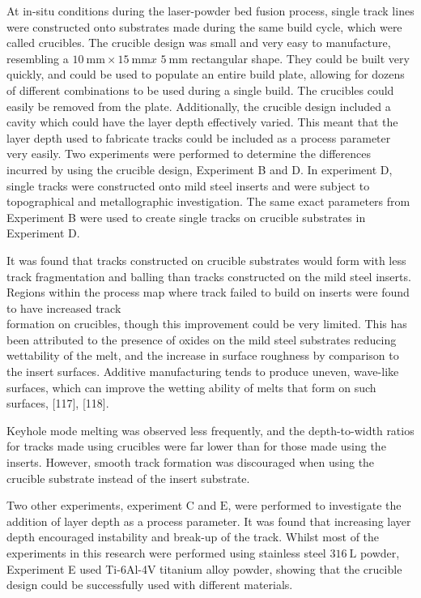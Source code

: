 \documentclass[10pt]{article}
\begin{document}
At in-situ conditions during the laser-powder bed fusion process, single track lines were constructed onto substrates made during the same build cycle, which were called crucibles. The crucible design was small and very easy to manufacture, resembling a $10 \mathrm{~mm} \times 15 \mathrm{~mm} x$ $5 \mathrm{~mm}$ rectangular shape. They could be built very quickly, and could be used to populate an entire build plate, allowing for dozens of different combinations to be used during a single build. The crucibles could easily be removed from the plate. Additionally, the crucible design included a cavity which could have the layer depth effectively varied. This meant that the layer depth used to fabricate tracks could be included as a process parameter very easily. Two experiments were performed to determine the differences incurred by using the crucible design, Experiment B and D. In experiment D, single tracks were constructed onto mild steel inserts and were subject to topographical and metallographic investigation. The same exact parameters from Experiment B were used to create single tracks on crucible substrates in Experiment D.

It was found that tracks constructed on crucible substrates would form with less track fragmentation and balling than tracks constructed on the mild steel inserts. Regions within the process map where track failed to build on inserts were found to have increased track\\
formation on crucibles, though this improvement could be very limited. This has been attributed to the presence of oxides on the mild steel substrates reducing wettability of the melt, and the increase in surface roughness by comparison to the insert surfaces. Additive manufacturing tends to produce uneven, wave-like surfaces, which can improve the wetting ability of melts that form on such surfaces, [117], [118].

Keyhole mode melting was observed less frequently, and the depth-to-width ratios for tracks made using crucibles were far lower than for those made using the inserts. However, smooth track formation was discouraged when using the crucible substrate instead of the insert substrate.

Two other experiments, experiment $\mathrm{C}$ and $\mathrm{E}$, were performed to investigate the addition of layer depth as a process parameter. It was found that increasing layer depth encouraged instability and break-up of the track. Whilst most of the experiments in this research were performed using stainless steel $316 \mathrm{~L}$ powder, Experiment E used Ti-6Al-4V titanium alloy powder, showing that the crucible design could be successfully used with different materials.
\end{document}
